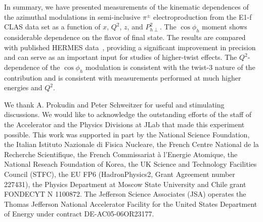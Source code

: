 \documentclass[aps,prl,twocolumn,showpacs,superscriptaddress,groupedaddress]{revtex4-1}  %
\newcommand{\Phperp}{P_{h\perp}}
\newcommand{\xbj}{x}
\begin{document}
 

In summary, we have presented measurements of the kinematic dependences of the azimuthal modulations in semi-inclusive $\pi ^\pm$ electroproduction from the E1-f CLAS data set as a function of $\xbj$, $Q^2$, $z$, and $\Phperp^2$.
The $\cos \phi_h$ moment shows considerable dependence on the flavor of final state. The results are compared with published HERMES data~\cite{Airapetian:2012yg}, 
providing  a significant improvement in precision and can serve as an important input for studies of higher-twist effects.
The  $Q^2$-dependence of the $\cos\phi_h$ modulation is consistent with 
the twist-3 nature of the contribution and is consistent with measurements performed at much higher energies and $Q^2$.

We thank A. Prokudin and Peter Schweitzer for useful and stimulating discussions.
We would like to acknowledge the outstanding efforts of the staff of the 
Accelerator and the Physics Divisions at JLab that made this experiment possible.
This work was supported in part by 
the National Science Foundation, 
the Italian Istituto Nazionale di Fisica Nucleare, 
the French Centre National de la Recherche Scientifique,
the French Commissariat \`{a} l'Energie Atomique, 
the National Reseach Foundation of Korea,
the UK Science and Technology Facilities Council (STFC),
the EU FP6 (HadronPhysics2, Grant Agreement number 227431),
the Physics Department at Moscow State University
and Chile grant FONDECYT N 1100872.
The Jefferson Science Associates (JSA) operates the Thomas Jefferson National Accelerator Facility for the United States Department of Energy under contract DE-AC05-06OR23177.
\end{document}
